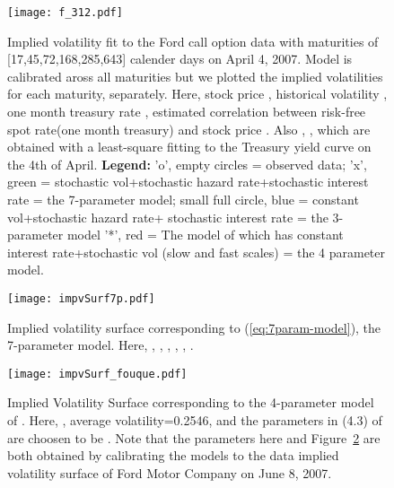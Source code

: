 \documentclass[11pt]{article}
\numberwithin{equation}{section}
\begin{document}
\begin{figure}[hb]
\begin{center}
\texttt{[image: f\_312.pdf]}
\caption{
Implied volatility fit to the Ford call option data with maturities of [17,45,72,168,285,643] calender days on  April 4, 2007. \newline Model is calibrated aross all maturities but  we plotted the implied volatilities for each maturity, separately.
Here, stock price , historical volatility , one month treasury rate , 
estimated correlation between risk-free spot rate(one month treasury) and stock price . 
Also , , 
which are obtained with a least-square fitting to the Treasury
yield curve on the 4th of April.
\newline
\textbf{Legend:} \newline
'o', empty circles = observed data; \newline 
'x', green = stochastic vol+stochastic hazard rate+stochastic interest rate = the 7-parameter model; \newline
small full circle, blue = constant vol+stochastic hazard rate+ stochastic interest rate = the 3-parameter model \newline
'*', red = The model of \cite{ronnie-timescale} which has constant interest rate+stochastic vol (slow and fast scales) = the 4 parameter model.
 }
\label{fig:impvolFord}
\end{center}
\end{figure}


\begin{figure}[hb]
\begin{center}
\texttt{[image: impvSurf7p.pdf]}
\caption{Implied volatility surface corresponding to (\ref{eq:7param-model}), the 7-parameter model. \newline 
Here, , , , 
 , ,
 .
}
\label{fig:imp7p}
\end{center}
\end{figure}

\begin{figure}[hb]
\begin{center}
\texttt{[image: impvSurf\_fouque.pdf]}
\caption{Implied Volatility Surface corresponding to the 4-parameter model of \cite{ronnie-timescale}. \newline Here, , average volatility=0.2546, and the parameters in (4.3) of \cite{ronnie-timescale} are choosen to be . Note that the parameters here and Figure~\ref{fig:imp7p} are both obtained by calibrating the models to the data implied volatility surface of Ford Motor Company on June 8, 2007.}
\label{fig:impvfouque}
\end{center}
\end{figure}
\end{document}
